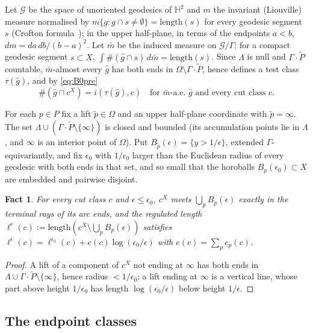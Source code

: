 \documentclass[aps,prd,onecolumn,superscriptaddress,nofootinbib,amsmath,amssymb,11pt]{revtex4-2}
\newtheorem{fact}[theorem]{Fact}
\theoremstyle{definition}
\newcommand{\Hyp}{\mathbb{H}^2}
\newcommand{\eps}{\epsilon}
\newcommand{\G}{\mathcal{G}}
\newcommand{\Gq}{\mathcal{G}/\Gamma}
\newcommand{\mbar}{\bar m}
\newcommand{\Pt}{\tilde P}
\begin{document}
Let $\G$ be the space of unoriented geodesics of $\Hyp$ and $m$ the invariant (Liouville) measure normalised by
$m\{g:g\cap s\ne\emptyset\}=\mathrm{length}(s)$ for every geodesic segment $s$ (Crofton formula~\cite{Santalo1976});
in the upper half-plane, in terms of the endpoints $a<b$, $dm=da\,db/(b-a)^2$. Let $\mbar$ be the induced measure
on $\Gq$; for a compact geodesic segment $s\subset X$, $\int\#(\hat g\cap s)\,d\mbar=\mathrm{length}(s)$. Since
$\Lambda$ is null and $\Gamma\cdot\Pt$ countable, $\mbar$-almost every $\hat g$ has both ends in
$\Omega\setminus\Gamma\cdot\Pt$, hence defines a test class $\tau(\hat g)$, and by \eqref{eq:B0pre}
\begin{equation}\label{eq:B0}
\#(\hat g\cap c^X)=i(\tau(\hat g),c)\quad\text{for $\mbar$-a.e.\ $\hat g$ and every cut class $c$.}
\end{equation}

For each $p\in P$ fix a lift $\tilde p\in\Omega$ and an upper half-plane coordinate with $\tilde p=\infty$. The set
$\Lambda\cup(\Gamma\cdot\Pt\setminus\{\infty\})$ is closed and bounded (its accumulation points lie in $\Lambda$, and
$\infty$ is an interior point of $\Omega$). Put $B_{\tilde p}(\eps)=\{y>1/\eps\}$, extended $\Gamma$-equivariantly,
and fix $\eps_0$ with $1/\eps_0$ larger than the Euclidean radius of every geodesic with both ends in that set,
and so small that the horoballs $B_p(\eps_0)\subset X$ are embedded and pairwise disjoint.

\begin{fact}\label{fact:ends}
For every cut class $c$ and $\eps\le\eps_0$, $c^X$ meets $\bigcup_pB_p(\eps)$ exactly in the terminal rays of its
arc ends, and the regulated length $\ell^\eps(c):=\mathrm{length}(c^X\setminus\bigcup_pB_p(\eps))$ satisfies
$\ell^\eps(c)=\ell^{\eps_0}(c)+e(c)\log(\eps_0/\eps)$ with $e(c)=\sum_pe_p(c)$.
\end{fact}

\begin{proof}
A lift of a component of $c^X$ not ending at $\infty$ has both ends in $\Lambda\cup\Gamma\cdot\Pt\setminus\{\infty\}$,
hence radius $<1/\eps_0$; a lift ending at $\infty$ is a vertical line, whose part above height $1/\eps_0$ has length
$\log(\eps_0/\eps)$ below height $1/\eps$.
\end{proof}

\subsection{The endpoint classes}
\end{document}
